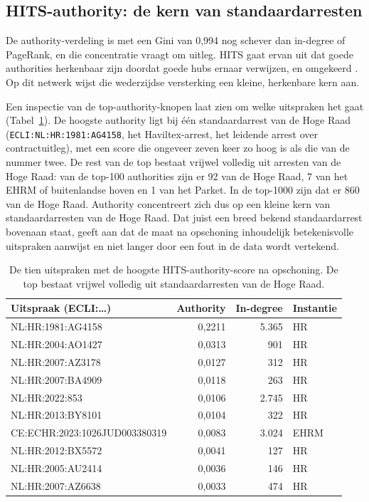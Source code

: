 \documentclass[a4paper, 12pt]{report}
\begin{document}
\subsection{HITS-authority: de kern van standaardarresten}
De authority-verdeling is met een Gini van 0,994 nog schever dan in-degree of PageRank, en die concentratie vraagt om uitleg. HITS gaat ervan uit dat goede authorities herkenbaar zijn doordat goede hubs ernaar verwijzen, en omgekeerd \parencite{kleinberg1999}. Op dit netwerk wijst die wederzijdse versterking een kleine, herkenbare kern aan.

Een inspectie van de top-authority-knopen laat zien om welke uitspraken het gaat (Tabel~\ref{tab:dv2-authority}). De hoogste authority ligt bij één standaardarrest van de Hoge Raad (\texttt{ECLI:NL:HR:1981:AG4158}, het Haviltex-arrest, het leidende arrest over contractuitleg), met een score die ongeveer zeven keer zo hoog is als die van de nummer twee. De rest van de top bestaat vrijwel volledig uit arresten van de Hoge Raad: van de top-100 authorities zijn er 92 van de Hoge Raad, 7 van het EHRM of buitenlandse hoven en 1 van het Parket. In de top-1000 zijn dat er 860 van de Hoge Raad. Authority concentreert zich dus op een kleine kern van standaardarresten van de Hoge Raad. Dat juist een breed bekend standaardarrest bovenaan staat, geeft aan dat de maat na opschoning inhoudelijk betekenisvolle uitspraken aanwijst en niet langer door een fout in de data wordt vertekend.

\begin{table}[H]
  \centering
  \small
  \caption{De tien uitspraken met de hoogste HITS-authority-score na opschoning. De top bestaat vrijwel volledig uit standaardarresten van de Hoge Raad.}
  \label{tab:dv2-authority}
  \begin{tabular}{lrrl}
    \toprule
    Uitspraak (ECLI:\ldots) & Authority & In-degree & Instantie \\
    \midrule
    NL:HR:1981:AG4158             & 0,2211 & 5.365 & HR \\
    NL:HR:2004:AO1427             & 0,0313 & 901   & HR \\
    NL:HR:2007:AZ3178             & 0,0127 & 312   & HR \\
    NL:HR:2007:BA4909             & 0,0118 & 263   & HR \\
    NL:HR:2022:853                & 0,0106 & 2.745 & HR \\
    NL:HR:2013:BY8101             & 0,0104 & 322   & HR \\
    CE:ECHR:2023:1026JUD003380319 & 0,0083 & 3.024 & EHRM \\
    NL:HR:2012:BX5572             & 0,0041 & 127   & HR \\
    NL:HR:2005:AU2414             & 0,0036 & 146   & HR \\
    NL:HR:2007:AZ6638             & 0,0033 & 474   & HR \\
    \bottomrule
  \end{tabular}
\end{table}
\end{document}
